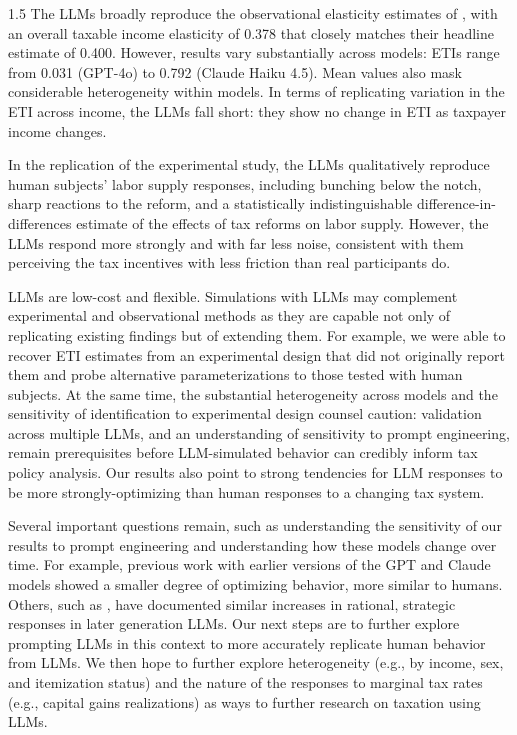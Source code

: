 \documentclass[letterpaper,9pt]{article}
\theoremstyle{definition}
\begin{document}
\begin{spacing}{1.5}
The LLMs broadly reproduce the observational elasticity estimates of \cite{GruberSaez2002}, with an overall taxable income elasticity of 0.378 that closely matches their headline estimate of 0.400. However, results vary substantially across models:  ETIs range from 0.031 (GPT-4o) to 0.792 (Claude Haiku 4.5). Mean values also mask considerable heterogeneity within models. In terms of replicating variation in the ETI across income, the LLMs fall short: they show no change in ETI as taxpayer income changes.

In the replication of the \cite{PKNF2024} experimental study, the LLMs qualitatively reproduce human subjects' labor supply responses, including bunching below the notch, sharp reactions to the reform, and a statistically indistinguishable difference-in-differences estimate of the effects of tax reforms on labor supply. However, the LLMs respond more strongly and with far less noise, consistent with them perceiving the tax incentives with less friction than real participants do.

LLMs are low-cost and flexible. Simulations with LLMs may complement experimental and observational methods as they are capable not only of replicating existing findings but of extending them. For example, we were able to recover ETI estimates from an experimental design that did not originally report them and probe alternative parameterizations to those tested with human subjects. At the same time, the substantial heterogeneity across models and the sensitivity of identification to experimental design counsel caution: validation across multiple LLMs, and an understanding of sensitivity to prompt engineering, remain prerequisites before LLM-simulated behavior can credibly inform tax policy analysis. Our results also point to strong tendencies for LLM responses to be more strongly-optimizing than human responses to a changing tax system.

Several important questions remain, such as understanding the sensitivity of our results to prompt engineering and understanding how these models change over time.  For example, previous work with earlier versions of the GPT and Claude models showed a smaller degree of optimizing behavior, more similar to humans.  Others, such as \cite{NBERw34745}, have documented similar increases in rational, strategic responses in later generation LLMs. Our next steps are to further explore prompting LLMs in this context to more accurately replicate human behavior from LLMs. We then hope to further explore heterogeneity (e.g., by income, sex, and itemization status) and the nature of the responses to marginal tax rates (e.g., capital gains realizations) as ways to further research on taxation using LLMs.


\end{spacing}
\end{document}
